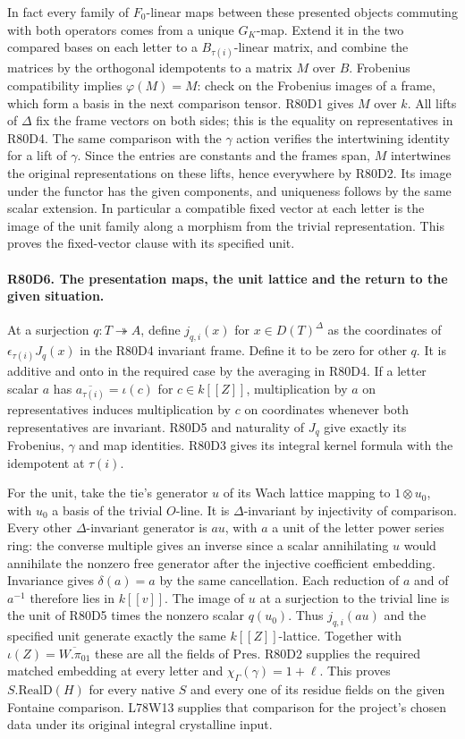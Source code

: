 In fact every family of $F_0$-linear maps between these presented
objects commuting with both operators comes from a unique $G_K$-map.
Extend it in the two compared bases on each letter to a
$B_{\tau(i)}$-linear matrix, and combine the matrices by the
orthogonal idempotents to a matrix $M$ over $B$. Frobenius
compatibility implies $\varphi(M)=M$: check on the Frobenius
images of a frame, which form a basis in the next comparison tensor.
R80D1 gives $M$ over $k$. All lifts of $\Delta$ fix the frame
vectors on both sides; this is the equality on representatives
in R80D4. The same comparison with the $\gamma$ action verifies
the intertwining identity for a lift of $\gamma$. Since the
entries are constants and the frames span, $M$ intertwines the
original representations on these lifts, hence everywhere by
R80D2. Its image under the functor has the given components,
and uniqueness follows by the same scalar extension. In particular
a compatible fixed vector at each letter is the image of the
unit family along a morphism from the trivial representation.
This proves the fixed-vector clause with its specified unit.

\paragraph{R80D6. The presentation maps, the unit lattice and the return to the given situation.}
At a surjection $q:T\twoheadrightarrow A$, define $j_{q,i}(x)$
for $x\in D(T)^\Delta$ as the coordinates of
$\epsilon_{\tau(i)}J_q(x)$ in the R80D4 invariant frame.
Define it to be zero for other $q$. It is additive and onto in
the required case by the averaging in R80D4. If a letter scalar
$a$ has $\overline{a_{\tau(i)}}=\iota(c)$ for $c\in k[[Z]]$,
multiplication by $a$ on representatives induces multiplication
by $c$ on coordinates whenever both representatives are invariant.
R80D5 and naturality of $J_q$ give exactly its Frobenius, $\gamma$
and map identities. R80D3 gives its integral kernel formula with
the idempotent at $\tau(i)$.

For the unit, take the tie's generator $u$ of its Wach lattice
mapping to $1\otimes u_0$, with $u_0$ a basis of the trivial
$O$-line. It is $\Delta$-invariant by injectivity of comparison.
Every other $\Delta$-invariant generator is $a u$, with $a$ a
unit of the letter power series ring: the converse multiple gives
an inverse since a scalar annihilating $u$ would annihilate the
nonzero free generator after the injective coefficient embedding.
Invariance gives $\delta(a)=a$ by the same cancellation.
Each reduction of $a$ and of $a^{-1}$ therefore lies in $k[[v]]$.
The image of $u$ at a surjection to the trivial line is the unit
of R80D5 times the nonzero scalar $q(u_0)$. Thus $j_{q,i}(au)$
and the specified unit generate exactly the same $k[[Z]]$-lattice.
Together with $\iota(Z)=\overline{W.\pi_{01}}$ these are all the
fields of $\mathrm{Pres}$. R80D2 supplies the required matched
embedding at every letter and $\chi_\Gamma(\gamma)=1+\ell$.
This proves $S.\mathrm{RealD}(H)$ for every native $S$ and every
one of its residue fields on the given Fontaine comparison.
L78W13 supplies that comparison for the project's chosen data
under its original integral crystalline input.

